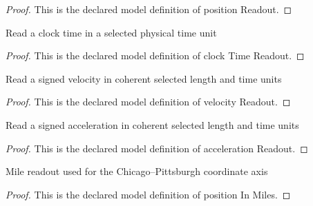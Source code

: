 \begin{proof}
  This is the declared model definition of position Readout.
\end{proof}
\begin{definition}
  \label{def:physics:phyx-mini-0830:phyxminiproblems-problemphyxmini0830-clocktimereadout}
  Read a clock time in a selected physical time unit
\end{definition}
\begin{proof}
  This is the declared model definition of clock Time Readout.
\end{proof}
\begin{definition}
  \label{def:physics:phyx-mini-0830:phyxminiproblems-problemphyxmini0830-velocityreadout}
  Read a signed velocity in coherent selected length and time units
\end{definition}
\begin{proof}
  This is the declared model definition of velocity Readout.
\end{proof}
\begin{definition}
  \label{def:physics:phyx-mini-0830:phyxminiproblems-problemphyxmini0830-accelerationreadout}
  Read a signed acceleration in coherent selected length and time units
\end{definition}
\begin{proof}
  This is the declared model definition of acceleration Readout.
\end{proof}
\begin{definition}
  \label{def:physics:phyx-mini-0830:phyxminiproblems-problemphyxmini0830-positioninmiles}
  Mile readout used for the Chicago--Pittsburgh coordinate axis
\end{definition}
\begin{proof}
  This is the declared model definition of position In Miles.
\end{proof}
